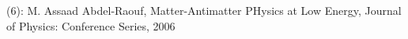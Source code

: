 \documentclass[preview]{standalone}
\begin{document}
\begin{center}
(6): M. Assaad Abdel-Raouf, Matter-Antimatter PHysics at Low Energy, Journal of Physics: Conference Series, 2006
\end{center}
\end{document}
